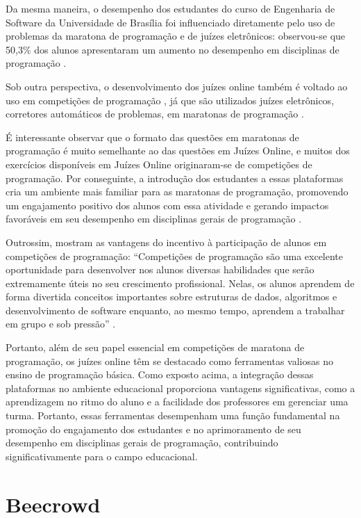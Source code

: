 Da mesma maneira, o desempenho dos estudantes do curso de Engenharia de Software da Universidade de Brasília foi influenciado diretamente pelo uso de problemas da maratona de programação e de juízes eletrônicos: observou-se que 50,3\% dos alunos apresentaram um aumento no desempenho em disciplinas de programação \cite[p.~218]{salescosta}.

Sob outra perspectiva, o desenvolvimento dos juízes online também é voltado ao uso em competições de programação \cite[p.~964-965]{santosribeiro}, já que são utilizados juízes eletrônicos, corretores automáticos de problemas, em maratonas de programação \cite[p.~34]{lima2023}. 

É interessante observar que o formato das questões em maratonas de programação é muito semelhante ao das questões em Juízes Online, e muitos dos exercícios disponíveis em Juízes Online originaram-se de competições de programação. Por conseguinte, a introdução dos estudantes a essas plataformas cria um ambiente mais familiar para as maratonas de programação, promovendo um engajamento positivo dos alunos com essa atividade e gerando impactos favoráveis em seu desempenho em disciplinas gerais de programação \cite[p.~33-34]{lima2023}.

Outrossim, \textcite[p.~2]{camposferreira} mostram as vantagens do incentivo à participação de alunos em competições de programação: “Competições de programação são uma excelente oportunidade para desenvolver nos alunos diversas habilidades que serão extremamente úteis no seu crescimento profissional. Nelas, os alunos aprendem de forma divertida conceitos importantes sobre estruturas de dados, algoritmos e desenvolvimento de software enquanto, ao mesmo tempo, aprendem a trabalhar em grupo e sob pressão” \cite[p.~2]{camposferreira}.

Portanto, além de seu papel essencial em competições de maratona de programação, os juízes online têm se destacado como ferramentas valiosas no ensino de programação básica. Como exposto acima, a integração dessas plataformas no ambiente educacional proporciona vantagens significativas, como a aprendizagem no ritmo do aluno e a facilidade dos professores em gerenciar uma turma. Portanto, essas ferramentas desempenham uma função fundamental na promoção do engajamento dos estudantes e no aprimoramento de seu desempenho em disciplinas gerais de programação, contribuindo significativamente para o campo educacional.


\section{Beecrowd}
\label{sec:beecrowd}

